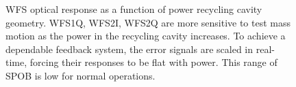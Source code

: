 \begin{figure}
\begin{centering}
\caption[Measured dependence of the WFS error signals on the power
recycling cavity geometry]{WFS optical response as a function of power
  recycling cavity geometry. WFS1Q, WFS2I, WFS2Q are more sensitive to
  test mass motion as the power in the recycling cavity increases. To
  achieve a dependable feedback system, the error signals are scaled
  in real-time, forcing their responses to be flat with power. This
  range of SPOB is low for normal operations.} 
\label{fig:WFStrack}
\end{centering}
\end{figure}












